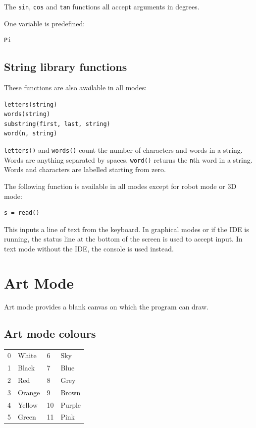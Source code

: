 \documentclass[12pt,a4paper,twoside]{article}
\renewcommand{\_}{\texttt{\symbol{95}}}
\begin{document}
The \verb^sin^, \verb^cos^ and \verb^tan^ functions all accept
arguments in degrees.

One variable is predefined:

\begin{verbatim}
Pi
\end{verbatim}

\subsection{String library functions} \label{sec:string-libr-funct} 

These functions are also available in all modes:

\begin{verbatim}
letters(string)
words(string)
substring(first, last, string)
word(n, string)
\end{verbatim}

\verb^letters()^ and \verb^words()^ count the number of characters
and words in a string. Words are anything separated by spaces.
\verb^word()^ returns the \verb^n^th word in a string. Words and
characters are labelled starting from zero.

The following function is available in all modes except for robot
mode or 3D mode:

\begin{verbatim}
s = read()
\end{verbatim}

This inputs a line of text from the keyboard. In graphical modes or if
the IDE is running, the status line at the bottom of the screen is used
to accept input. In text mode without the IDE, the console is used instead.

\newpage
\section{Art Mode} \label{sec:art-mode}

Art mode provides a blank canvas on which the program can draw.

\subsection{Art mode colours}

\label{roboc:colours}
\begin{tabular}{|ll|ll|}
\hline
\rule{0mm}{4.5mm}%
0 & White   & 6  & Sky\\
1 & Black   & 7  & Blue\\
2 & Red     & 8  & Grey\\
3 & Orange  & 9  & Brown\\
4 & Yellow  & 10 & Purple\\
5 & Green   & 11 & Pink\\
\hline
\end{tabular}
\end{document}
